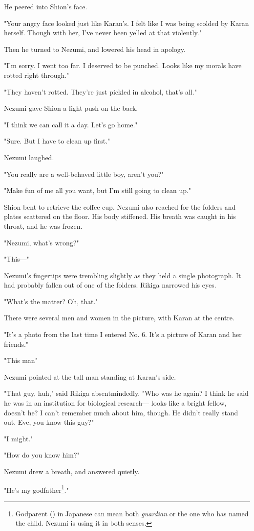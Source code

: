 He peered into Shion's face.

"Your angry face looked just like Karan's. I felt like I was being
scolded by Karan herself. Though with her, I've never been yelled at
that violently."

Then he turned to Nezumi, and lowered his head in apology.

"I'm sorry. I went too far. I deserved to be punched. Looks like my
morals have rotted right through."

"They haven't rotted. They're just pickled in alcohol, that's all."

Nezumi gave Shion a light push on the back.

"I think we can call it a day. Let's go home."

"Sure. But I have to clean up first."

Nezumi laughed.

"You really are a well-behaved little boy, aren't you?"

"Make fun of me all you want, but I'm still going to clean up."

Shion bent to retrieve the coffee cup. Nezumi also reached for the
folders and plates scattered on the floor. His body stiffened. His
breath was caught in his throat, and he was frozen.

"Nezumi, what's wrong?"

"This---"

Nezumi's fingertips were trembling slightly as they held a single
photograph. It had probably fallen out of one of the folders. Rikiga
narrowed his eyes.

"What's the matter? Oh, that."

There were several men and women in the picture, with Karan at the
centre.

"It's a photo from the last time I entered No. 6. It's a picture of
Karan and her friends."

"This man\el "

Nezumi pointed at the tall man standing at Karan's side.

"That guy, huh," said Rikiga absentmindedly. "Who was he again? I think
he said he was in an institution for biological research--- looks like a
bright fellow, doesn't he? I can't remember much about him, though. He
didn't really stand out. Eve, you know this guy?"

"I might."

"How do you know him?"

Nezumi drew a breath, and answered quietly.

"He's my godfather\footnote{Godparent () in Japanese can mean both \emph{guardian} or the one who has named the child. Nezumi is using it in both senses.}."